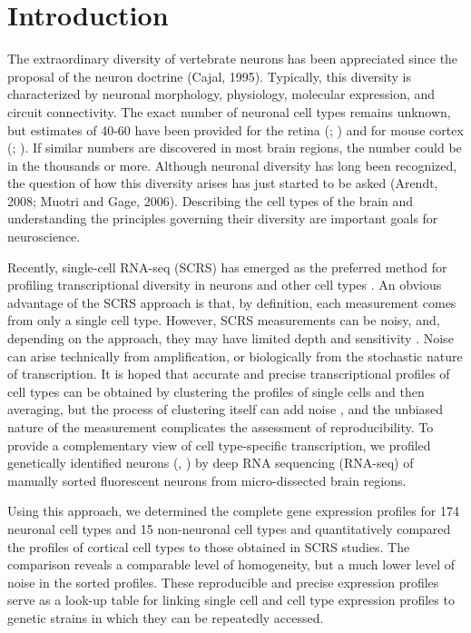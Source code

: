 \section*{Introduction}


The extraordinary diversity of vertebrate neurons has been appreciated since the proposal of the neuron doctrine (Cajal, 1995). Typically, this diversity is characterized by neuronal morphology, physiology, molecular expression, and circuit connectivity. The exact number of neuronal cell types remains unknown, but estimates of 40-60 have been provided for the retina (\cite{Macosko_2015}; \cite{Masland_2004}) and for mouse cortex (\cite{Tasic_2016}; \cite{Zeisel_2015}). If similar numbers are discovered in most brain regions, the number could be in the thousands or more. Although neuronal diversity has long been recognized, the question of how this diversity arises has just started to be asked (Arendt, 2008; Muotri and Gage, 2006). Describing the cell types of the brain and understanding the principles governing their diversity are important goals for neuroscience.

Recently, single-cell RNA-seq (SCRS) has emerged as the preferred method for profiling transcriptional diversity in neurons and other cell types \cite{Shapiro_2013}. An obvious advantage of the SCRS approach is that, by definition, each measurement comes from only a single cell type. However, SCRS measurements can be noisy, and, depending on the approach, they may have limited depth and sensitivity \cite{Parekh_2016}\cite{Svensson_2017}. Noise can arise technically from amplification, or biologically from the stochastic nature of transcription. It is hoped that accurate and precise transcriptional profiles of cell types can be obtained by clustering the profiles of single cells and then averaging, but the process of clustering itself can add noise \cite{Ntranos_2016}, and the unbiased nature of the measurement complicates the assessment of reproducibility. To provide a complementary view of cell type-specific transcription, we profiled genetically identified neurons (\cite{Gong_2003}, \cite{Shima_2016}) by deep RNA sequencing (RNA-seq) of manually sorted fluorescent neurons from micro-dissected brain regions.  

Using this approach, we determined the complete gene expression profiles for 174 neuronal cell types and 15 non-neuronal cell types and quantitatively compared the profiles of cortical cell types to those obtained in SCRS studies. The comparison reveals a comparable level of homogeneity, but a much lower level of noise in the sorted profiles. These reproducible and precise expression profiles serve as a look-up table for linking single cell and cell type expression profiles to genetic strains in which they can be repeatedly accessed. 

